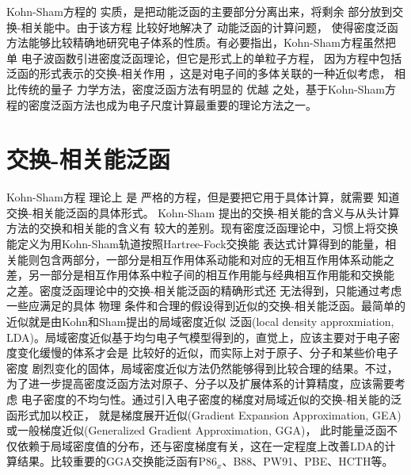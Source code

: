 Kohn-Sham方程的%
实质，是把动能泛函的主要部分分离出来，将剩余%
部分放到交换-相关能中。由于该方程%
{比较好地}解决了%
动能泛函的{计算}问题，%
使得密度泛函方法能够比较精确地研究电子体系的性质。有必要指出，Kohn-Sham方程虽然把单%
电子波函数引进密度泛函理论，但它是{\heiti 形式上的单粒子方程}，%
因为方程中包括泛函的形式表示的交换-相关作用%
，这是对电子间的多体关联的一种近似考虑，%
{相比}传统的量子%
{力}学方法，密度泛函方法有明显的%
优越%
{之处}，基于Kohn-Sham方程的密度泛函方法也成为电子尺度计算最重要的{理论}方法之一。

\section{交换-相关能泛函}
Kohn-Sham方程%
理论上%
是%
严格的方程，但是要把它用于具体计算，就需要%
{知道}交换-相关能泛函的具体形式。%
Kohn-Sham%
提出的交换-相关能的含义与从头计算方法的交换和相关能的含义有%
{较}大的差别{。现有}密度泛函理论中，习惯上将交换能定义为用Kohn-Sham轨道按照Hartree-Fock交换能%
{表达}式计算得到的能量，相关能则包含两部分，一部分是相互作用体系动能和对应的无相互作用体系动能{之}差，另一部分是相互作用体系中粒子间的相互作用能与经典相互作用{能}和交换能%
{之}差。密度泛函{理论}中的交换-相关能泛函的精确形式还%
{无法}得到，只能通过{考虑}一些{应满足的}具体%
物理%
{条件}和合理的假设得到近似的交换-相关能泛函。最简单的近似就是由Kohn和Sham提出的局域密度近似%
{泛函}(local density approxmiation, LDA)\cite{PR140-A1133_1965}{。}局域密度近似基于均匀电子气模型得到的，直觉上，应该主要对于电子密度变化缓慢的体系{才会}是%
比较好的近似，而实际上对于原子、分子和某些价电子密度%
剧烈变化的固体，局域密度近似方法仍然能够得到比较合理的结果。不过，为了进一步提高密度泛函方法对原子、分子以及扩展体系的计算精度，应该需要考虑%
电子密度的不均匀性。通过引入电子密度的梯度对{局域近似的}交换-相关能的{泛函}形式加以校正，%
{就是}梯度展开近似(Gradient Expansion Approximation, GEA)%
{或}一般梯度近似(Generalized Gradient Approximation, GGA)，%
此时能量泛函不仅依赖于局域密度值的分布，还与密度梯度有关，这在一定程度上改善LDA的计算结果。比较重要的GGA交换能泛函有P86$_x$\cite{PRB33-8800_1986}、B88\cite{PRA38-3098_1988}、PW91\cite{PRB46-6671_1992,PRB48-4978_1993,PRB54-16533_1996,PRB57-14999_1998}、PBE\cite{PRL77-1396_1996,IBID78-1396_1997}、HCTH\cite{JCP109-6264_1998}等。

